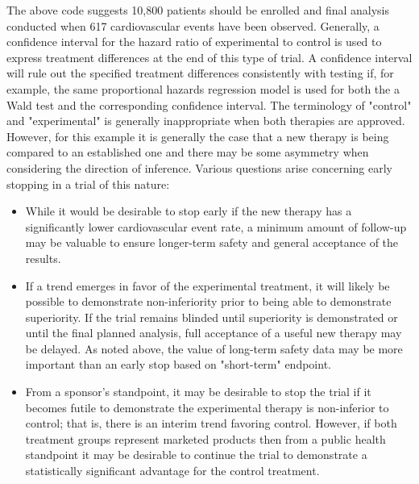 The above code suggests 10,800 patients should be enrolled and final analysis conducted when 617 cardiovascular events have been observed.
Generally, a confidence interval for the hazard ratio of experimental to control is used to express treatment differences at the end of this type of trial.
A confidence interval will rule out the specified treatment differences consistently with testing if, for example, the same proportional hazards regression model is used for both the a Wald test and the corresponding confidence interval.
The terminology of "control" and "experimental" is generally inappropriate when both therapies are approved.
However, for this example it is generally the case that a new therapy is being compared to an established one and there may be some asymmetry when considering the direction of inference.
Various questions arise concerning early stopping in a trial of this nature:
\begin{itemize}
\item While it would be desirable to stop early if the new therapy has a significantly lower cardiovascular event rate, a minimum amount of follow-up may be valuable to ensure longer-term safety and general acceptance of the results.
\item If a trend emerges in favor of the experimental treatment, it will likely be possible to demonstrate non-inferiority prior to being able to demonstrate superiority. If the trial remains blinded until superiority is demonstrated or until the final planned analysis, full acceptance of a useful new therapy may be delayed. 
As noted above, the value of long-term safety data may be more important than an early stop based on "short-term" endpoint.
\item From a sponsor's standpoint, it may be desirable to stop the trial if it becomes futile to demonstrate the experimental therapy is non-inferior to control; that is, there is an interim trend favoring control. However, if both treatment groups represent marketed products then from a public health standpoint it may be desirable to continue the trial to demonstrate a statistically significant advantage for the control treatment.
\end{itemize}
